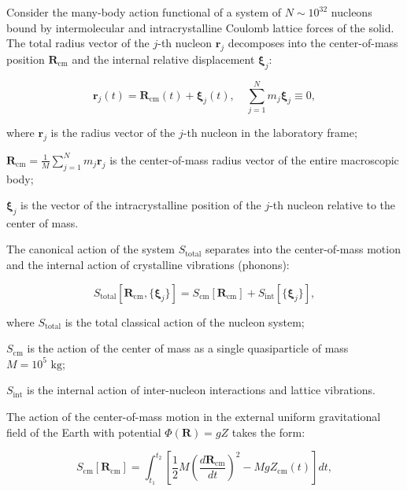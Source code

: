 \documentclass[11pt,a4paper]{article}
\theoremstyle{definition}
\begin{document}
Consider the many-body action functional of a system of $N \sim 10^{32}$ nucleons bound by intermolecular and intracrystalline Coulomb lattice forces of the solid. The total radius vector of the $j$-th nucleon $\mathbf{r}_j$ decomposes into the center-of-mass position $\mathbf{R}_{\text{cm}}$ and the internal relative displacement $\boldsymbol{\xi}_j$:

\begin{equation}\label{eq:5.3}\tag{5.3}
\mathbf{r}_j(t) = \mathbf{R}_{\text{cm}}(t) + \boldsymbol{\xi}_j(t), \quad \sum_{j=1}^N m_j \boldsymbol{\xi}_j \equiv 0,
\end{equation}

where $\mathbf{r}_j$ is the radius vector of the $j$-th nucleon in the laboratory frame;  

$\mathbf{R}_{\text{cm}} = \frac{1}{M}\sum_{j=1}^N m_j \mathbf{r}_j$ is the center-of-mass radius vector of the entire macroscopic body;  

$\boldsymbol{\xi}_j$ is the vector of the intracrystalline position of the $j$-th nucleon relative to the center of mass.

The canonical action of the system $S_{\text{total}}$ separates into the center-of-mass motion and the internal action of crystalline vibrations (phonons):

\begin{equation}\label{eq:5.4}\tag{5.4}
S_{\text{total}}[\mathbf{R}_{\text{cm}}, \{\boldsymbol{\xi}_j\}] = S_{\text{cm}}[\mathbf{R}_{\text{cm}}] + S_{\text{int}}[\{\boldsymbol{\xi}_j\}],
\end{equation}

where $S_{\text{total}}$ is the total classical action of the nucleon system;  

$S_{\text{cm}}$ is the action of the center of mass as a single quasiparticle of mass $M = 10^5\text{ kg}$;  

$S_{\text{int}}$ is the internal action of inter-nucleon interactions and lattice vibrations.

The action of the center-of-mass motion in the external uniform gravitational field of the Earth with potential $\Phi(\mathbf{R}) = g Z$ takes the form:

\begin{equation}\label{eq:5.5}\tag{5.5}
S_{\text{cm}}[\mathbf{R}_{\text{cm}}] = \int_{t_1}^{t_2} \left[ \frac{1}{2} M \left( \frac{d\mathbf{R}_{\text{cm}}}{dt} \right)^2 - M g Z_{\text{cm}}(t) \right] dt,
\end{equation}
\end{document}
